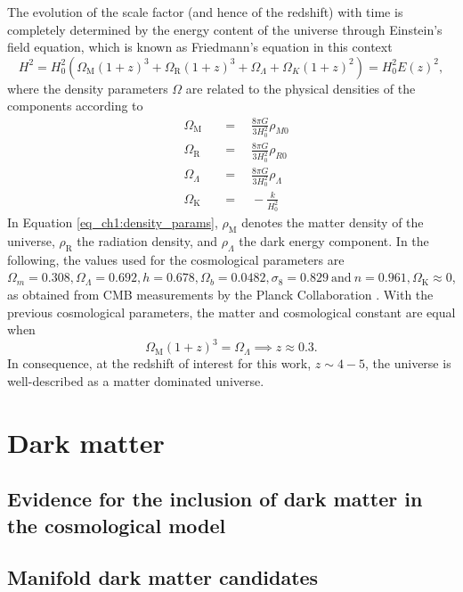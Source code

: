 The evolution of the scale factor (and hence of the redshift) with time is completely determined by the energy content of the universe through Einstein's field equation, which is known as Friedmann's equation in this context
\begin{equation}
    H^2=H_0^2\left( \Omega_\text{M} (1+z)^3+\Omega_\text{R} (1+z)^3 +\Omega_\Lambda + \Omega_K (1+z)^2 \right)=H_0^2E(z)^2,
\end{equation}
where the density parameters $\Omega$ are related to the physical densities of the components according to
\begin{equation}\label{eq_ch1:density_params}
    \begin{aligned}&\Omega_\text{M}&&=\quad\frac{8\pi G}{3H_0^2}\rho_{M0}\\&\Omega_\text{R}&&=\quad\frac{8\pi G}{3H_0^2}\rho_{R0}\\&\Omega_{\Lambda}&&=\quad\frac{8\pi G}{3H_0^2}\rho_{\Lambda}\\&\Omega_\text{K}&&=\quad-\frac k{H_0^2}\end{aligned}
\end{equation}
In Equation \ref{eq_ch1:density_params}, $\rho_\text{M}$ denotes the matter density of the universe, $\rho_\text{R}$ the radiation density, and $\rho_\Lambda$ the dark energy component. In the following, the values used for the cosmological parameters are $\Omega_m=0.308,\Omega_\Lambda=0.692,h=0.678,\Omega_b=0.0482,\sigma_8=0.829\mathrm{~and~}n=0.961, \Omega_\text{K}\approx 0$, as obtained from CMB measurements by the Planck Collaboration \cite{planck2014}. With the previous cosmological parameters, the matter and cosmological constant are equal when
\begin{equation}
    \Omega_\text{M}(1+z)^3=\Omega_\Lambda \implies z\approx 0.3.
\end{equation}
In consequence, at the redshift of interest for this work, $z\sim 4-5$, the universe is well-described as a matter dominated universe.





\section{Dark matter}
\subsection{Evidence for the inclusion of dark matter in the cosmological model}
\subsection{Manifold dark matter candidates}
